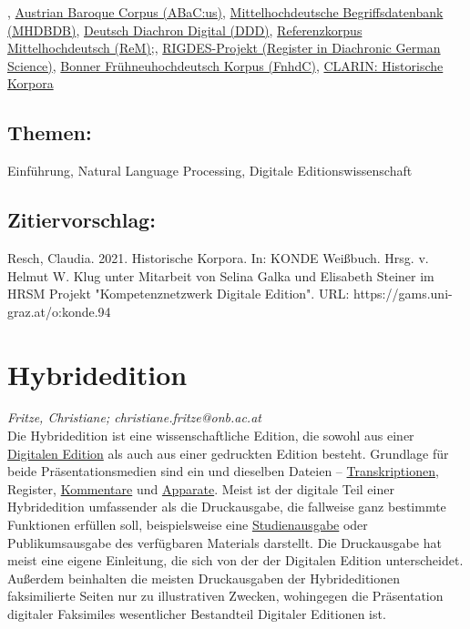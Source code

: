 \documentclass{article}
\begin{document}
{}, \href{https://acdh.oeaw.ac.at/abacus/}{Austrian Baroque Corpus (ABaC:us)}, \href{http://mhdbdb.sbg.ac.at/}{Mittelhochdeutsche Begriffsdatenbank (MHDBDB)}, \href{https://www.deutschdiachrondigital.de/}{Deutsch Diachron Digital (DDD)}, \href{https://www.linguistics.rub.de/rem/}{Referenzkorpus Mittelhochdeutsch (ReM);}, \href{https://www.linguistik.hu-berlin.de/de/institut/professuren/korpuslinguistik/forschung/ridges-projekt}{RIGDES-Projekt (Register in Diachronic German Science)}, \href{https://korpora.zim.uni-duisburg-essen.de/FnhdC/}{Bonner Frühneuhochdeutsch Korpus (FnhdC)}, \href{https://www.clarin.eu/resource-families/historical-corpora}{CLARIN: Historische Korpora}\subsection*{Themen:}Einführung, Natural Language Processing, Digitale Editionswissenschaft\subsection*{Zitiervorschlag:}Resch, Claudia. 2021. Historische Korpora. In: KONDE Weißbuch. Hrsg. v. Helmut W. Klug unter Mitarbeit von Selina Galka und Elisabeth Steiner im HRSM Projekt "Kompetenznetzwerk Digitale Edition". URL: https://gams.uni-graz.at/o:konde.94\newpage\section*{Hybridedition} \emph{Fritze, Christiane; christiane.fritze@onb.ac.at }\\
        
    Die Hybridedition ist eine wissenschaftliche Edition, die sowohl aus einer \href{http://gams.uni-graz.at/o:konde.59}{Digitalen Edition} als auch aus einer gedruckten Edition besteht. Grundlage für beide Präsentationsmedien sind ein und dieselben Dateien – \href{http://gams.uni-graz.at/o:konde.197}{Transkriptionen}, Register, \href{http://gams.uni-graz.at/o:konde.34}{Kommentare} und \href{http://gams.uni-graz.at/o:konde.32}{Apparate}. Meist ist der digitale Teil einer Hybridedition umfassender als die Druckausgabe, die fallweise ganz bestimmte Funktionen erfüllen soll, beispielsweise eine \href{http://gams.uni-graz.at/o:konde.173}{Studienausgabe} oder Publikumsausgabe des verfügbaren Materials darstellt. Die Druckausgabe hat meist eine eigene Einleitung, die sich von der der Digitalen Edition unterscheidet. Außerdem beinhalten die meisten Druckausgaben der Hybrideditionen faksimilierte Seiten nur zu illustrativen Zwecken, wohingegen die Präsentation digitaler Faksimiles wesentlicher Bestandteil Digitaler Editionen ist.\\
            
\end{document}
